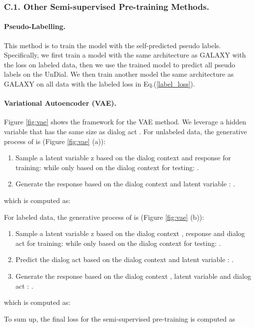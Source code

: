 \documentclass[letterpaper]{article} \usepackage{aaai22}  \usepackage{times}  \usepackage{helvet}  \usepackage{courier}  \usepackage[hyphens]{url}  \usepackage{graphicx} \urlstyle{rm} \def\UrlFont{\rm}  \usepackage{natbib}  \usepackage{caption} \DeclareCaptionStyle{ruled}{labelfont=normalfont,labelsep=colon,strut=off} \frenchspacing  \setlength{\pdfpagewidth}{8.5in}  \setlength{\pdfpageheight}{11in}  \usepackage{algorithm}
\begin{document}
\subsubsection{C.1. Other Semi-supervised Pre-training Methods.}
\label{AppxC_1}
\paragraph{Pseudo-Labelling.} 
This method is to train the model with the self-predicted pseudo labels.
Specifically, we first train a model with the same architecture as GALAXY with the loss  on labeled data, then we use the trained model to predict all pseudo labels on the UnDial. We then train another model the same architecture as GALAXY on all data with the labeled loss in Eq.(\ref{label_loss}). 

\paragraph{Variational Autoencoder (VAE).} 
Figure \ref{fig:vae} shows the framework for the VAE method. We leverage a hidden variable  that has the same size as dialog act . 
For unlabeled data, the generative process of  is (Figure \ref{fig:vae} (a)):
\begin{enumerate}
    \item Sample a latent variable z based on the dialog context  and response  for training:   while only based on the dialog context  for testing: .
    \item Generate the response  based on the dialog context  and latent variable : .
\end{enumerate}
which is computed as:



For labeled data, the generative process of  is (Figure \ref{fig:vae} (b)):
\begin{enumerate}
    \item Sample a latent variable z based on the dialog context , response  and dialog act  for training:   while only based on the dialog context  for testing: .
    \item Predict the dialog act  based on the dialog context  and latent variable : .
    \item Generate the response  based on the dialog context , latent variable  and dialog act : .
\end{enumerate}
which is computed as:



To sum up, the final loss  for the semi-supervised pre-training is computed as
\end{document}
